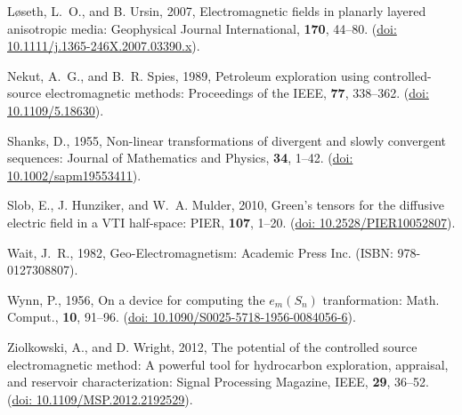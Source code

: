 \documentclass[manuscript]{geophysics}
\begin{document}
\begin{thebibliography}{}
Løseth, L.~O., and B. Ursin,  2007, Electromagnetic fields in planarly layered
  anisotropic media: Geophysical Journal International, {\bf 170}, 44--80.
\newblock (\href{http://dx.doi.org/10.1111/j.1365-246X.2007.03390.x}{doi:
  10.1111/j.1365-246X.2007.03390.x}).

Nekut, A.~G., and B.~R. Spies,  1989, Petroleum exploration using
  controlled-source electromagnetic methods: Proceedings of the IEEE, {\bf 77},
  338--362.
\newblock
  (\href{http://ieeexplore.ieee.org/lpdocs/epic03/wrapper.htm?arnumber=18630}{doi:
  10.1109/5.18630}).

Shanks, D.,  1955, Non-linear transformations of divergent and slowly
  convergent sequences: Journal of Mathematics and Physics, {\bf 34}, 1--42.
\newblock (\href{http://dx.doi.org/10.1002/sapm19553411}{doi:
  10.1002/sapm19553411}).

Slob, E., J. Hunziker, and W.~A. Mulder,  2010, Green's tensors for the
  diffusive electric field in a {VTI} half-space: PIER, {\bf 107}, 1--20.
\newblock (\href{http://dx.doi.org/10.2528/PIER10052807}{doi:
  10.2528/PIER10052807}).

Wait, J.~R.,  1982, Geo-{E}lectromagnetism: Academic Press Inc.
\newblock ({I}SBN: 978-0127308807).

Wynn, P.,  1956, {On a device for computing the $e_m(S_n)$ tranformation}:
  Math. Comput., {\bf 10}, 91--96.
\newblock (\href{http://dx.doi.org/10.1090/S0025-5718-1956-0084056-6}{doi:
  10.1090/S0025-5718-1956-0084056-6}).

Ziolkowski, A., and D. Wright,  2012, The potential of the controlled source
  electromagnetic method: A powerful tool for hydrocarbon exploration,
  appraisal, and reservoir characterization: Signal Processing Magazine, IEEE,
  {\bf 29}, 36--52.
\newblock (\href{http://dx.doi.org/10.1109/MSP.2012.2192529}{doi:
  10.1109/MSP.2012.2192529}).

\end{thebibliography}
\end{document}
